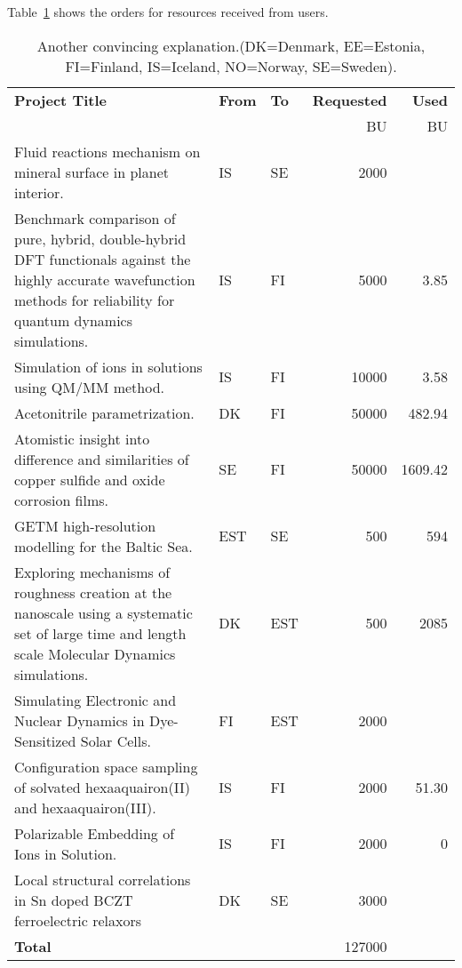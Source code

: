 Table~\ref{tab:projects} shows the orders for resources received from users.
\begin{table}
\begin{center}
\begin{tabular}{|p{7cm}|l|l|r|r|} \hline
\bf Project Title & \bf From & \bf To &\bf Requested &\bf Used \\
                  & & & BU & BU \\\hline
Fluid reactions mechanism on mineral surface in planet interior. & IS & SE & 2000 &  \\
Benchmark comparison of pure, hybrid, double-hybrid DFT functionals against the highly accurate wavefunction methods for reliability for quantum dynamics simulations. & IS & FI & 5000 & 3.85 \\
Simulation of ions in solutions using QM/MM method. & IS & FI & 10000 & 3.58 \\
Acetonitrile parametrization. & DK & FI & 50000 & 482.94 \\
Atomistic insight into difference and similarities of copper sulfide and oxide corrosion films. & SE & FI & 50000 & 1609.42 \\
GETM high-resolution modelling for the Baltic Sea. & EST & SE & 500 & 594\\
Exploring mechanisms of roughness creation at the nanoscale using a systematic set of large time and length scale Molecular Dynamics simulations. & DK & EST & 500 & {2085}\\
Simulating Electronic and Nuclear Dynamics in Dye-Sensitized Solar Cells. & FI & EST & 2000 & \\
Configuration space sampling of solvated hexaaquairon(II) and hexaaquairon(III). & IS & FI & 2000 & 51.30 \\
Polarizable Embedding of Ions in Solution. & IS & FI & 2000 & 0 \\
Local structural correlations in Sn doped BCZT ferroelectric relaxors & DK & SE & 3000 & \\
\bf Total & & & 127000 & \\\hline
\end{tabular}
\caption{Another convincing explanation.(DK=Denmark, EE=Estonia, FI=Finland, IS=Iceland, NO=Norway, SE=Sweden). \label{tab:projects}}
\end{center}
\end{table}
